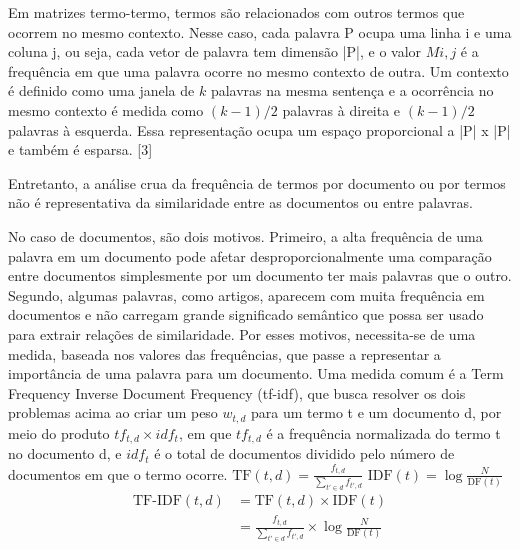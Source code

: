 Em matrizes termo-termo, termos são relacionados com outros termos que ocorrem no mesmo contexto.
Nesse caso, cada palavra P ocupa uma linha i e uma coluna j, ou seja, cada vetor de palavra tem dimensão |P|, e o valor $Mi,j$ é a frequência em que uma palavra ocorre no
mesmo contexto de outra.
Um contexto é definido como uma janela de $k$ palavras na mesma sentença e a ocorrência no mesmo contexto é medida como
$(k-1)/2$ palavras à direita e $(k-1)/2$ palavras à esquerda.
Essa representação ocupa um espaço proporcional a |P| x |P| e também é esparsa.
[3]

Entretanto, a análise crua da frequência de termos por documento ou por termos não é representativa da similaridade
entre as documentos ou entre palavras.

No caso de documentos, são dois motivos.
Primeiro, a alta frequência de uma palavra em um documento pode afetar desproporcionalmente uma comparação entre documentos
simplesmente por um documento ter mais palavras que o outro.
Segundo, algumas palavras, como artigos, aparecem com muita frequência em documentos e não
carregam grande significado semântico que possa ser usado para extrair relações de similaridade.
Por esses motivos, necessita-se de uma medida, baseada nos valores das frequências, que passe a representar
a importância de uma palavra para um documento.
Uma medida comum é a Term Frequency Inverse Document Frequency (tf-idf), que busca resolver os dois problemas acima ao criar
um peso $w_{t,d}$ para um termo t e um documento d, por meio do produto $tf_{t,d} \times idf_{t}$, em que $tf_{t,d}$ é
a frequência normalizada do termo t no documento d, e $idf_{t}$ é o total de documentos dividido pelo número de documentos
em que o termo ocorre.
$\text{TF}(t, d) = \frac{f_{t, d}}{\sum_{t' \in d} f_{t', d}}$
$\text{IDF}(t) = \log \frac{N}{\text{DF}(t)}$
\begin{align*}
\text{TF-IDF}(t, d) &= \text{TF}(t, d) \times \text{IDF}(t) \\
&= \frac{f_{t, d}}{\sum_{t' \in d} f_{t', d}} \times \log \frac{N}{\text{DF}(t)}
\end{align*}

